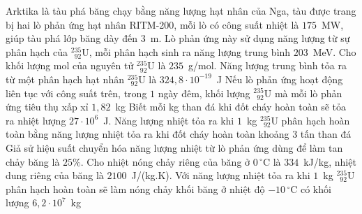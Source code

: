 	\begin{ex}%
		Arktika là tàu phá băng chạy bằng năng lượng hạt nhân của Nga, tàu được trang bị hai lò phản ứng hạt nhân RITM-200, mỗi lò có công suất nhiệt là $175$~MW, giúp tàu phá lớp băng dày đến $3$~m. Lò phản ứng này sử dụng năng lượng từ sự phân hạch của ${}^{235}_{\phantom{2}92}\text{U}$, mỗi phân hạch sinh ra năng lượng trung bình $203$~MeV. Cho khối lượng mol của nguyên tử ${}^{235}_{\phantom{2}92}\text{U}$ là $235$~g/mol.
		\choiceTFt
		{Năng lượng trung bình tỏa ra từ một phân hạch hạt nhân ${}^{235}_{\phantom{2}92}\text{U}$ là $324{,}8\cdot 10^{-19}$~J}
		{Nếu lò phản ứng hoạt động liên tục với công suất trên, trong $1$ ngày đêm, khối lượng ${}^{235}_{\phantom{2}92}\text{U}$ mà mỗi lò phản ứng tiêu thụ xấp xỉ $1{,}82$~kg}
		{Biết mỗi kg than đá khi đốt cháy hoàn toàn sẽ tỏa ra nhiệt lượng $27\cdot 10^6$~J. Năng lượng nhiệt tỏa ra khi $1$~kg ${}^{235}_{\phantom{2}92}\text{U}$ phân hạch hoàn toàn bằng năng lượng nhiệt tỏa ra khi đốt cháy hoàn toàn khoảng $3$ tấn than đá}
		{Giả sử hiệu suất chuyển hóa năng lượng nhiệt từ lò phản ứng dùng để làm tan chảy băng là $25\%$. Cho nhiệt nóng chảy riêng của băng ở $0\,^\circ\text{C}$ là $334$~kJ/kg, nhiệt dung riêng của băng là $2100$~J/(kg.K). Với năng lượng nhiệt tỏa ra khi $1$~kg ${}^{235}_{\phantom{2}92}\text{U}$ phân hạch hoàn toàn sẽ làm nóng chảy khối băng ở nhiệt độ $-10\,^\circ\text{C}$ có khối lượng $6{,}2\cdot 10^7$~kg}
	\end{ex}

